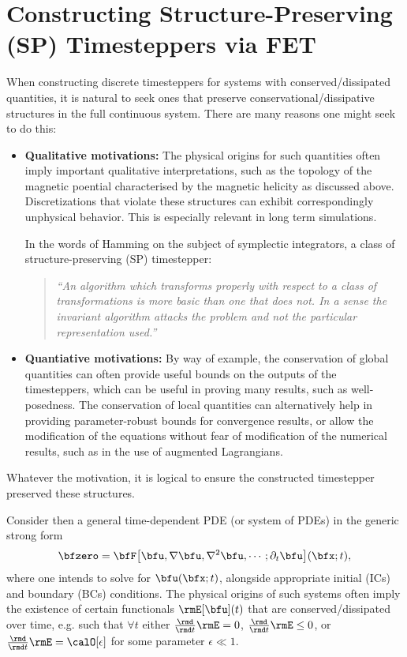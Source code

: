 \section{Constructing Structure-Preserving (SP) Timesteppers via FET}
    When constructing discrete timesteppers for systems with conserved/dissipated quantities, it is natural to seek ones that preserve conservational/dissipative structures in the full continuous system. There are many reasons one might seek to do this:
    \begin{itemize}
        \item  {\bf Qualitative motivations:} The physical origins for such quantities often imply important qualitative interpretations, such as the topology of the magnetic poential characterised by the magnetic helicity as discussed above. Discretizations that violate these structures can exhibit correspondingly unphysical behavior. This is especially relevant in long term simulations. 
        
        In the words of Hamming on the subject of symplectic integrators, a class of structure-preserving (SP) timestepper: \cite{Hamming_1986}
        \begin{quotation}
            \emph{``An algorithm which transforms properly with respect to a class of transformations is more basic than one that does not. In a sense the invariant algorithm attacks the problem and not the particular representation used.''}
        \end{quotation}
        

        \item  {\bf Quantiative motivations:} By way of example, the conservation of global quantities can often provide useful bounds on the outputs of the timesteppers, which can be useful in proving many results, such as well-posedness. The conservation of local quantities can alternatively help in providing parameter-robust bounds for convergence results, or allow the modification of the equations without fear of modification of the numerical results, such as in the use of augmented Lagrangians. \cite{FMW19, LFM22}
    \end{itemize}
    Whatever the motivation, it is logical to ensure the constructed timestepper preserved these structures.

    Consider then a general time-dependent PDE (or system of PDEs) in the generic strong form
    \begin{equation}\label{eqn:general time-dependent PDE}
        \bfzero  =  \bfF\!\left[\bfu, \nabla\bfu, \nabla^{2}\bfu, \cdots; \partial_{t}\bfu\right]\!(\bfx; t),
    \end{equation}
    where one intends to solve for $\bfu(\bfx; t)$, alongside appropriate initial (ICs) and boundary (BCs) conditions. The physical origins of such systems often imply the existence of certain functionals $\rmE[\bfu](t)$ that are conserved/dissipated over time, e.g. such that $\forall  t$ either $\frac{\rmd}{\rmd t}\rmE  =  0$, $\frac{\rmd}{\rmd t}\rmE  \leq  0$, or $\frac{\rmd}{\rmd t}\rmE  =  \calO[\epsilon]$ for some parameter $\epsilon \ll 1$.
    
